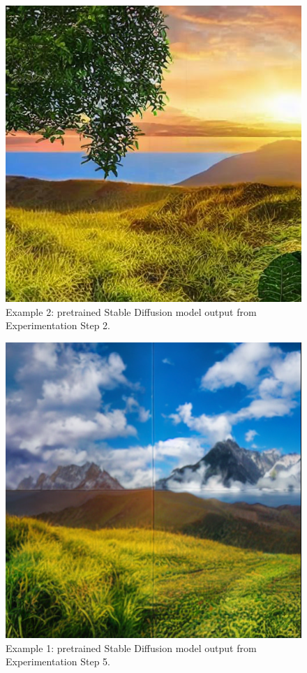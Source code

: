 \documentclass[sigconf]{acmart}
\begin{document}
\begin{figure}[h!]
    \centering
    \includegraphics[width=\linewidth]{stable_diffusion_step_2_2}
    \caption{Example 2: pretrained Stable Diffusion model output from Experimentation Step 2.}
    \label{fig:stable_diffusion_step_2_2}
\end{figure}

\begin{figure}[h!]
    \centering
    \includegraphics[width=\linewidth]{stable_diffusion_step_5}
    \caption{Example 1: pretrained Stable Diffusion model output from Experimentation Step 5.}
    \label{fig:stable_diffusion_step_5}
\end{figure}
\end{document}
